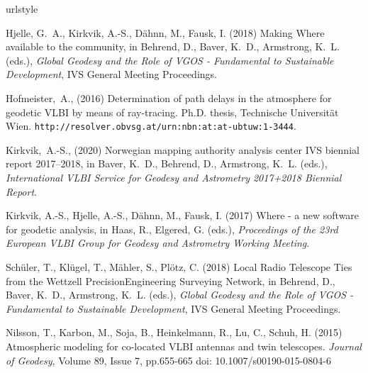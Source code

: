 \documentclass[natbib,twocolumn,twoside]{svmultiag}
\begin{document}
\begin{thebibliography}{99}
\providecommand{\natexlab}[1]{#1}
\providecommand{\url}[1]{\texttt{#1}}
\expandafter\ifx\csname urlstyle\endcsname\relax
  \providecommand{\doi}[1]{doi: #1}\else
  \providecommand{\doi}{doi: \begingroup \urlstyle{rm}\Url}\fi

Hjelle, G.~A., Kirkvik, A.-S., D\"ahnn, M., Fausk, I. (2018)
\newblock Making Where available to the community,
\newblock in Behrend,   D., Baver, K.~D., Armstrong, K.~L. (eds.), \emph{Global Geodesy and the Role
  of VGOS - Fundamental to Sustainable Development}, IVS General Meeting Proceedings.

Hofmeister,~A., (2016)
\newblock Determination of path delays in the atmosphere for
  geodetic VLBI by means of ray-tracing.
\newblock  Ph.D. thesis, Technische Universit\"at Wien.
\newblock \url{http://resolver.obvsg.at/urn:nbn:at:at-ubtuw:1-3444}.

Kirkvik,~A.-S., (2020)
\newblock Norwegian mapping authority analysis center {IVS} biennial
  report 2017--2018, 
\newblock in Baver, K.~D., Behrend, D., Armstrong, K.~L. (eds.),
  \emph{International VLBI Service for Geodesy and Astrometry 2017+2018
  Biennial Report}.

Kirkvik, A.-S., Hjelle, A.-S., D\"ahnn, M., Fausk, I. (2017)
\newblock Where - a new software for geodetic analysis,
\newblock in Haas, R., Elgered, G. (eds.), \emph{Proceedings of the 23rd European VLBI Group for
  Geodesy and Astrometry Working Meeting}.

Sch\"uler, T., Kl\"ugel, T., M\"ahler, S., Pl\"otz, C. (2018)
\newblock Local Radio Telescope Ties from the Wettzell PrecisionEngineering Surveying Network,
\newblock in Behrend,   D., Baver, K.~D., Armstrong, K.~L. (eds.), \emph{Global Geodesy and the Role
  of VGOS - Fundamental to Sustainable Development}, IVS General Meeting Proceedings.

Nilsson, T., Karbon, M., Soja, B., Heinkelmann, R., Lu, C., Schuh, H. (2015)
\newblock Atmospheric modeling for co-located VLBI antennas and twin telescopes.
\newblock \emph{Journal of Geodesy}, Volume 89, Issue 7, pp.655-665
\newblock \doi{10.1007/s00190-015-0804-6}
 
% 
% 

\end{thebibliography}
\end{document}
